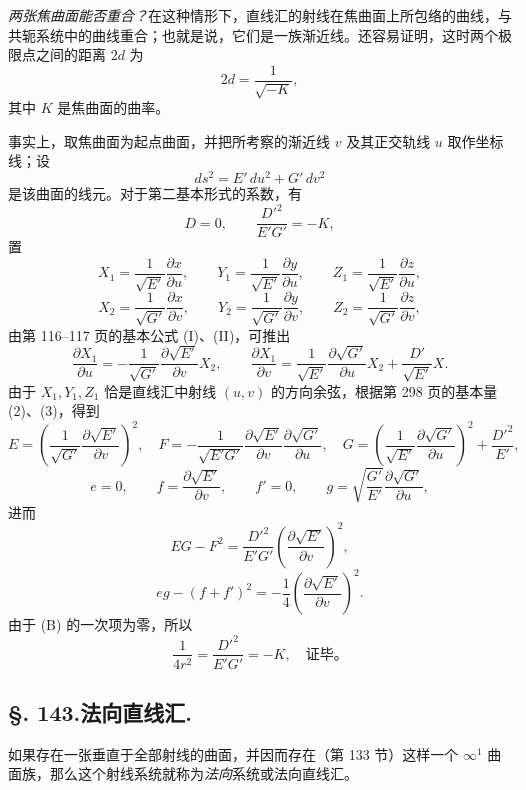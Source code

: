 \emph{两张焦曲面能否重合？}在这种情形下，直线汇的射线在焦曲面上所包络的曲线，与共轭系统中的曲线重合；也就是说，它们是一族渐近线。还容易证明，这时两个极限点之间的距离 \(2d\) 为
\[
 2d=\frac1{\sqrt{-K}},
\]
其中 \(K\) 是焦曲面的曲率。

事实上，取焦曲面为起点曲面，并把所考察的渐近线 \(v\) 及其正交轨线 \(u\) 取作坐标线；设
\[
 ds^2=E'\,du^2+G'\,dv^2
\]
是该曲面的线元。对于第二基本形式的系数，有
\[
 D=0,
 \qquad \frac{D'^2}{E'G'}=-K,
\]
置
\[
 X_1=\frac1{\sqrt{E'}}\frac{\partial x}{\partial u},
 \qquad Y_1=\frac1{\sqrt{E'}}\frac{\partial y}{\partial u},
 \qquad Z_1=\frac1{\sqrt{E'}}\frac{\partial z}{\partial u},
\]
\[
 X_2=\frac1{\sqrt{G'}}\frac{\partial x}{\partial v},
 \qquad Y_2=\frac1{\sqrt{G'}}\frac{\partial y}{\partial v},
 \qquad Z_2=\frac1{\sqrt{G'}}\frac{\partial z}{\partial v},
\]
由第 116--117 页的基本公式 (I)、(II)，可推出
\[
 \frac{\partial X_1}{\partial u}=-\frac1{\sqrt{G'}}\frac{\partial\sqrt{E'}}{\partial v}X_2,
 \qquad
 \frac{\partial X_1}{\partial v}=\frac1{\sqrt{E'}}\frac{\partial\sqrt{G'}}{\partial u}X_2+\frac{D'}{\sqrt{E'}}X.
\]
由于 \(X_1,Y_1,Z_1\) 恰是直线汇中射线 \((u,v)\) 的方向余弦，根据第 298 页的基本量 (2)、(3)，得到
\[
 E=\left(\frac1{\sqrt{G'}}\frac{\partial\sqrt{E'}}{\partial v}\right)^2,
 \quad
 F=-\frac1{\sqrt{E'G'}}\frac{\partial\sqrt{E'}}{\partial v}\frac{\partial\sqrt{G'}}{\partial u},
 \quad
 G=\left(\frac1{\sqrt{E'}}\frac{\partial\sqrt{G'}}{\partial u}\right)^2+\frac{D'^2}{E'},
\]
\[
 e=0,
 \qquad f=\frac{\partial\sqrt{E'}}{\partial v},
 \qquad f'=0,
 \qquad g=\sqrt{\frac{G'}{E'}}\frac{\partial\sqrt{G'}}{\partial u},
\]
进而
\[
 EG-F^2=\frac{D'^2}{E'G'}\left(\frac{\partial\sqrt{E'}}{\partial v}\right)^2,
\]
\[
 eg-\left(f+f'\right)^2=-\frac14\left(\frac{\partial\sqrt{E'}}{\partial v}\right)^2.
\]
由于 (B) 的一次项为零，所以
\[
 \frac1{4r^2}=\frac{D'^2}{E'G'}=-K,
 \quad \text{证毕。}
\]

\subsection*{\S. 143.\quad 法向直线汇.}

如果存在一张垂直于全部射线的曲面，并因而存在（第 133 节）这样一个 \(\infty^1\) 曲面族，那么这个射线系统就称为\emph{法向}系统或法向直线汇。

